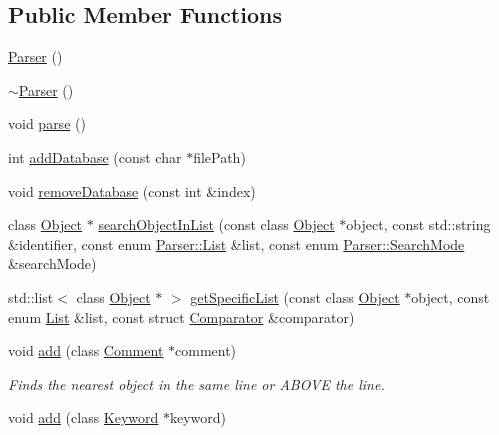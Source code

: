 \subsection*{Public Member Functions}
\begin{CompactItemize}
\item 
\hyperlink{classvjassdoc_1_1Parser_00bc950338009454d91f0596ab6f46b1}{Parser} ()
\item 
\hyperlink{classvjassdoc_1_1Parser_168d8430293c2ee5f66a94e95c2feccb}{$\sim$Parser} ()
\item 
void \hyperlink{classvjassdoc_1_1Parser_25594f25b429a8ff7a4ed426ee0f3184}{parse} ()
\item 
int \hyperlink{classvjassdoc_1_1Parser_919b030073a5008b4e7e8d467258adb3}{addDatabase} (const char $\ast$filePath)
\item 
void \hyperlink{classvjassdoc_1_1Parser_389d28f9b81aa6a9c40d6d55e7c518a1}{removeDatabase} (const int \&index)
\item 
class \hyperlink{classvjassdoc_1_1Object}{Object} $\ast$ \hyperlink{classvjassdoc_1_1Parser_2929834a3d98897abd02af423eb49667}{searchObjectInList} (const class \hyperlink{classvjassdoc_1_1Object}{Object} $\ast$object, const std::string \&identifier, const enum \hyperlink{classvjassdoc_1_1Parser_4ef39527519272daf05a22b5276062ad}{Parser::List} \&list, const enum \hyperlink{classvjassdoc_1_1Parser_ed659a05a08c7db4e2d233d133efdfda}{Parser::SearchMode} \&searchMode)
\item 
std::list$<$ class \hyperlink{classvjassdoc_1_1Object}{Object} $\ast$ $>$ \hyperlink{classvjassdoc_1_1Parser_930bbcf436121ba4f972d68dcceb96ae}{getSpecificList} (const class \hyperlink{classvjassdoc_1_1Object}{Object} $\ast$object, const enum \hyperlink{classvjassdoc_1_1Parser_4ef39527519272daf05a22b5276062ad}{List} \&list, const struct \hyperlink{structvjassdoc_1_1Parser_1_1Comparator}{Comparator} \&comparator)
\item 
void \hyperlink{classvjassdoc_1_1Parser_9c5f7cb3c5f1203cd16f85eeeb9356d4}{add} (class \hyperlink{classvjassdoc_1_1Comment}{Comment} $\ast$comment)
\begin{CompactList}\small\item\em Finds the nearest object in the same line or ABOVE the line. \item\end{CompactList}\item 
void \hyperlink{classvjassdoc_1_1Parser_ca0eb0b534b582339722c7eb9a8fb8fc}{add} (class \hyperlink{classvjassdoc_1_1Keyword}{Keyword} $\ast$keyword)

\end{CompactItemize}
